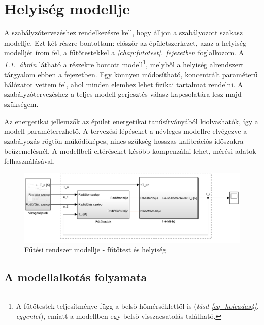 \chapter{Helyiség modellje}\label{chap:helyiseg}


A szabályzótervezéshez rendelkezésre kell, hogy álljon a szabályozott szakasz modellje. Ezt két részre bontottam: először az épületszerkezet, azaz a helyiség modelljét írom fel, a fűtőtestekkel a \textit{\ref{chap:futotest}. fejezetben} foglalkozom. A \textit{\ref{fig:Simulink-minimalist}.~ábrán} látható a részekre bontott modell\footnote{A fűtőtestek teljesítménye függ a belső hőmérséklettől is (\textit{lásd \ref{eq_holeadas4}. egyenlet}), emiatt a modellben egy belső visszacsatolás található.}, melyből a helyiség alrendszert tárgyalom ebben a fejezetben. Egy könnyen módosítható, koncentrált paraméterű hálózatot vettem fel, ahol minden elemhez lehet fizikai tartalmat rendelni. A szabályzótervezéshez a teljes modell gerjesztés-válasz kapcsolatára lesz majd szükségem.

Az energetikai jellemzők az épület energetikai tanúsítványából kiolvashatók, így a modell paraméterezhető. A tervezési lépéseket a névleges modellre elvégezve a szabályozás rögtön működőképes, nincs szükség hosszas kalibrációs időszakra beüzemelésnél. A modellbeli eltéréseket később kompenzálni lehet, mérési adatok felhasználásával.%

\begin{figure}[H]
	\centering
	\includegraphics[trim=0 0 0 0, clip,width=\textwidth]{figures/simulink-network-minimalist-layout}
	\caption{Fűtési rendszer modellje - fűtőtest és helyiség}
	\label{fig:Simulink-minimalist}
\end{figure}

\section{A modellalkotás folyamata}
%

